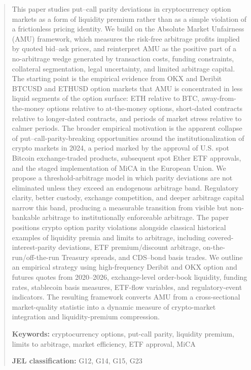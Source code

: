 \documentclass[12pt]{article}
\begin{document}
\begin{abstract}
This paper studies put--call parity deviations in cryptocurrency option markets as a form of liquidity premium rather than as a simple violation of a frictionless pricing identity. We build on the Absolute Market Unfairness (AMU) framework, which measures the risk-free arbitrage profits implied by quoted bid--ask prices, and reinterpret AMU as the positive part of a no-arbitrage wedge generated by transaction costs, funding constraints, collateral segmentation, legal uncertainty, and limited arbitrage capital. The starting point is the empirical evidence from OKX and Deribit BTCUSD and ETHUSD option markets that AMU is concentrated in less liquid segments of the option surface: ETH relative to BTC, away-from-the-money options relative to at-the-money options, short-dated contracts relative to longer-dated contracts, and periods of market stress relative to calmer periods. The broader empirical motivation is the apparent collapse of put--call-parity-breaking opportunities around the institutionalization of crypto markets in 2024, a period marked by the approval of U.S. spot Bitcoin exchange-traded products, subsequent spot Ether ETF approvals, and the staged implementation of MiCA in the European Union. We propose a threshold-arbitrage model in which parity deviations are not eliminated unless they exceed an endogenous arbitrage band. Regulatory clarity, better custody, exchange competition, and deeper arbitrage capital narrow this band, producing a measurable transition from visible but non-bankable arbitrage to institutionally enforceable arbitrage. The paper positions crypto option parity violations alongside classical historical examples of liquidity premia and limits to arbitrage, including covered-interest-parity deviations, ETF premium/discount arbitrage, on-the-run/off-the-run Treasury spreads, and CDS--bond basis trades. We outline an empirical strategy using high-frequency Deribit and OKX option and futures quotes from 2020--2026, exchange-level order-book liquidity, funding rates, stablecoin basis measures, ETF-flow variables, and regulatory-event indicators. The resulting framework converts AMU from a cross-sectional market-quality statistic into a dynamic measure of crypto-market integration and liquidity-premium compression.

\medskip
\textbf{Keywords:} cryptocurrency options, put-call parity, liquidity premium, limits to arbitrage, market efficiency, ETF approval, MiCA

\medskip
\textbf{JEL classification:} G12, G14, G15, G23
\end{abstract}
\end{document}
